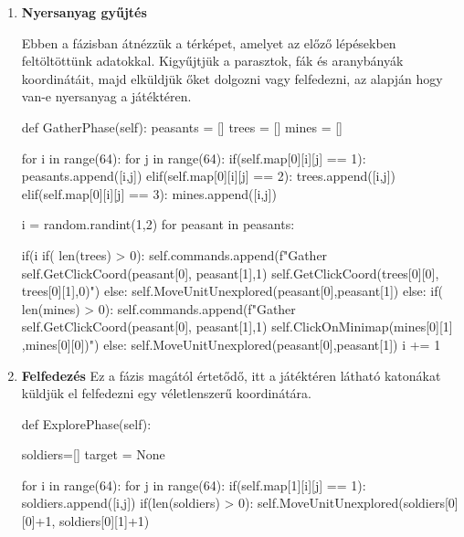 \begin{enumerate}
    \item \textbf{Nyersanyag gyűjtés}

    Ebben a fázisban átnézzük a térképet, amelyet az előző lépésekben feltöltöttünk adatokkal. Kigyűjtjük a parasztok, fák és aranybányák koordinátáit, majd elküldjük őket dolgozni vagy felfedezni, az alapján hogy van-e nyersanyag a játéktéren.

    \begin{python}
        
def GatherPhase(self):
    peasants = []
    trees = []
    mines = []

    for i in range(64):
        for j in range(64):
            if(self.map[0][i][j] == 1):
                peasants.append([i,j])
            elif(self.map[0][i][j] == 2):
                trees.append([i,j])
            elif(self.map[0][i][j] == 3):
                mines.append([i,j])

    i = random.randint(1,2)
    for peasant in peasants:
            
        if(i %
            if( len(trees) > 0):
                self.commands.append(f"Gather 
                {self.GetClickCoord(peasant[0],
                peasant[1],1)} { self.GetClickCoord(trees[0][0],
                trees[0][1],0)}")
            else:
                self.MoveUnitUnexplored(peasant[0],peasant[1])
        else:
            if( len(mines) > 0):
                self.commands.append(f"Gather 
                {self.GetClickCoord(peasant[0],
                peasant[1],1)} { self.ClickOnMinimap(mines[0][1]
                ,mines[0][0])}")
            else:
                self.MoveUnitUnexplored(peasant[0],peasant[1])
        i += 1
\end{python}

\item \textbf{Felfedezés}
Ez a fázis magától értetődő, itt a játéktéren látható katonákat küldjük el felfedezni egy véletlenszerű koordinátára.
 \begin{python}
def ExplorePhase(self):

    soldiers=[]
    target = None
        
    for i in range(64):
        for j in range(64):
            if(self.map[1][i][j] == 1):
                soldiers.append([i,j])
    if(len(soldiers) > 0):
        self.MoveUnitUnexplored(soldiers[0][0]+1,
        soldiers[0][1]+1)
    \end{python}


\end{enumerate}
